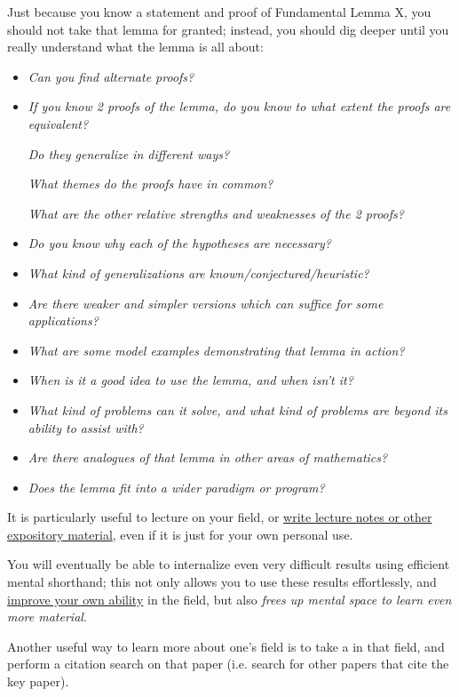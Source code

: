 \documentclass{book}
\numberwithin{equation}{section}
\begin{document}
%
Just because you know a statement and proof of Fundamental Lemma X, you should not take that lemma for granted; instead, you should dig deeper until you really understand what the lemma is all about:
\begin{itemize}
    \item \textit{Can you find alternate proofs?}
    \item \textit{If you know 2 proofs of the lemma, do you know to what extent the proofs are equivalent?}
    
    \textit{Do they generalize in different ways?}
    
    \textit{What themes do the proofs have in common?}
    
    \textit{What are the other relative strengths and weaknesses of the 2 proofs?}
    \item \textit{Do you know why each of the hypotheses are necessary?}
    \item \textit{What kind of generalizations are known/conjectured/heuristic?}
    \item \textit{Are there weaker and simpler versions which can suffice for some applications?}
    \item \textit{What are some model examples demonstrating that lemma in action?}
    \item \textit{When is it a good idea to use the lemma, and when isn't it?}
    \item \textit{What kind of problems can it solve, and what kind of problems are beyond its ability to assist with?}
    \item \textit{Are there analogues of that lemma in other areas of mathematics?}
    \item \textit{Does the lemma fit into a wider paradigm or program?}
\end{itemize}
It is particularly useful to lecture on your field, or \href{https://terrytao.wordpress.com/career-advice/write-down-what-youve-done/}{write lecture notes or other expository material}, even if it is just for your own personal use.

You will eventually be able to internalize even very difficult results using efficient mental shorthand; this not only allows you to use these results effortlessly, and \href{https://terrytao.wordpress.com/career-advice/continually-aim-just-beyond-your-current-range/}{improve your own ability} in the field, but also \textit{frees up mental space to learn even more material}.

%
Another useful way to learn more about one's field is to take a  in that field, and perform a citation search on that paper (i.e. search for other papers that cite the key paper).
\end{document}
